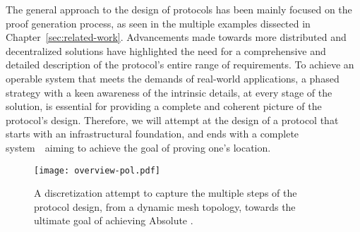 The general approach to the design of \pol{} protocols has been mainly focused on the proof generation process, as seen in the multiple examples dissected in Chapter~\ref{sec:related-work}. Advancements made towards more distributed and decentralized solutions have highlighted the need for a comprehensive and detailed description of the protocol's entire range of requirements. To achieve an operable system that meets the demands of real-world applications, a phased strategy with a keen awareness of the intrinsic details, at every stage of the solution, is essential for providing a complete and coherent picture of the protocol's design. Therefore, we will attempt at the design of a \pol{} protocol that starts with an infrastructural foundation, and ends with a complete system~\textemdash~aiming to achieve the goal of proving one's location.

\begin{figure}[ht]
    \begin{center}
    \texttt{[image: overview-pol.pdf]}
    \caption{A discretization attempt to capture the multiple steps of the protocol design, from a dynamic mesh topology, towards the ultimate goal of achieving Absolute \pol.}
    \label{fig:proof-of-location-overview}
    \end{center}
\end{figure}


